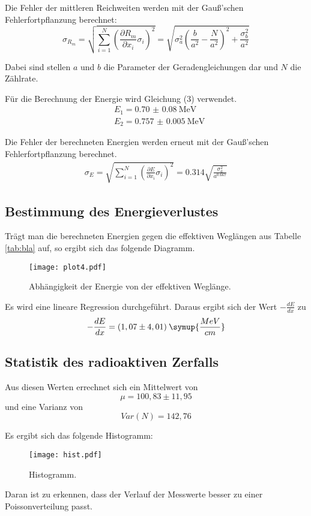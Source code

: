 Die Fehler der mittleren Reichweiten werden mit der Gauß'schen Fehlerfortpflanzung berechnet:
\begin{equation}
  \sigma_{R_m} = \sqrt{
      \sum\limits_{i = 1}^N
       \left( \frac{\partial R_m}{\partial x_i} \sigma_i \right)^{\!\! 2}
     } = \sqrt{\sigma_{a}^{2} \left(\frac{b}{a^{2}} - \frac{N}{a^{2}}\right)^{2} + \frac{\sigma_{b}^{2}}{a^{2}} }
\end{equation}

Dabei sind stellen $a$ und $b$ die Parameter der Geradengleichungen dar und $N$ die Zählrate.

Für die Berechnung der Energie wird Gleichung (3) verwendet.
\begin{align*}
  &E_1 = \SI{0.70(8)}{\mega\eV} \\
  &E_2 = \SI{0.757(5)}{\mega\eV}
\end{align*}

Die Fehler der berechneten Energien werden erneut mit der Gauß'schen Fehlerfortpflanzung berechnet.
\begin{align*}
  \sigma_{E} = \sqrt{
      \sum\limits_{i = 1}^N
       \left( \frac{\partial E}{\partial x_i} \sigma_i \right)^{\!\! 2}
     } = 0.314 \sqrt{\frac{\sigma_{a}^{2}}{a^{0.667}}}
\end{align*}


\subsection{Bestimmung des Energieverlustes}
Trägt man die berechneten Energien gegen die effektiven Weglängen aus Tabelle \ref{tab:bla} auf,
so ergibt sich das folgende Diagramm.
\begin{figure}[H]
  \centering
  \texttt{[image: plot4.pdf]}
  \caption{Abhängigkeit der Energie von der effektiven Weglänge.}
  \label{fig:plot4}
\end{figure}
Es wird eine lineare Regression durchgeführt. Daraus ergibt sich der Wert $-\frac{dE}{dx}$ zu
\begin{equation*}
  -\frac{dE}{dx} = (1,07 \pm 4,01) \: \symup{\frac{MeV}{cm}}
\end{equation*}

\subsection{Statistik des radioaktiven Zerfalls}
Aus diesen Werten errechnet sich ein Mittelwert von
\begin{equation*}
  \mu = 100,83 \pm 11,95
\end{equation*}
und eine Varianz von
\begin{equation*}
  Var(N) = 142,76
\end{equation*}

Es ergibt sich das folgende Histogramm:
\begin{figure}[H]
  \centering
  \texttt{[image: hist.pdf]}
  \caption{Histogramm.}
  \label{fig:hist}
\end{figure}

Daran ist zu erkennen, dass der Verlauf der Messwerte besser zu einer Poissonverteilung passt.
